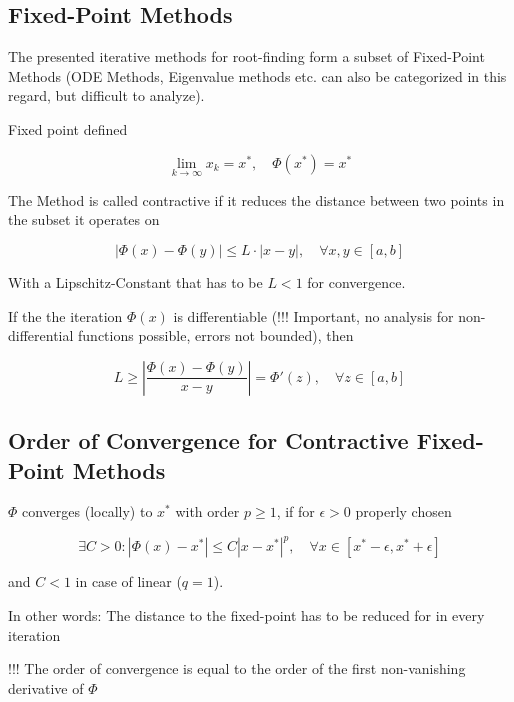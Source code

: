 \documentclass[
    a4paper,
    11pt
]{article}
\begin{document}
\subsection{Fixed-Point Methods}

The presented iterative methods for root-finding form a subset of Fixed-Point
Methods (ODE Methods, Eigenvalue methods etc. can also be categorized in this
regard, but difficult to analyze).

Fixed point defined

\begin{equation}
    \lim_{k \to \infty} x_k = x^*, \quad \Phi(x^*) = x^*
\end{equation}

The Method is called contractive if it reduces the distance between two points
in the subset it operates on

\begin{equation}
    |\Phi(x) - \Phi(y) | \leq L \cdot | x - y |, \quad \forall x, y \in [a, b]
\end{equation}

With a Lipschitz-Constant that has to be $L<1$ for convergence.

If the the iteration $\Phi(x)$ is differentiable (!!! Important, no analysis for
non-differential functions possible, errors not bounded), then

\begin{equation}
    L \geq \left| \frac{\Phi(x) - \Phi(y)}{x - y} \right| = \Phi'(z), \quad
    \forall z \in [a,b]
\end{equation}

\subsection{Order of Convergence for Contractive Fixed-Point Methods}

$\Phi$ converges (locally) to $x^*$ with order $p \geq 1 $, if for $\epsilon > 0
$ properly chosen

\begin{equation}
    \exists C > 0 : |\Phi(x) - x^*| \leq C |x - x^*|^p, \quad \forall x \in [x^*
    - \epsilon, x^* + \epsilon]
\end{equation}

and $C < 1$ in case of linear ($q = 1$).

In other words: The distance to the fixed-point has to be reduced for in every
iteration

!!! The order of convergence is equal to the order of the first non-vanishing
derivative of $\Phi$
\end{document}
